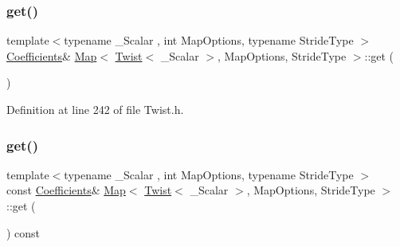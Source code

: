 \subsubsection{\texorpdfstring{get()}{get()}\hspace{0.1cm}{\footnotesize\ttfamily [1/2]}}
{\footnotesize\ttfamily template$<$typename \+\_\+\+Scalar , int Map\+Options, typename Stride\+Type $>$ \\
\hyperlink{class_map_3_01_twist_3_01___scalar_01_4_00_01_map_options_00_01_stride_type_01_4_aed5862495c86340dcb689412d79eb66a}{Coefficients}\& \hyperlink{class_map_3_01_twist_3_01___scalar_01_4_00_01_map_options_00_01_stride_type_01_4_a7bc49d9365cdda555f4d107d55a1c6b2}{Map}$<$ \hyperlink{class_twist}{Twist}$<$ \+\_\+\+Scalar $>$, Map\+Options, Stride\+Type $>$\+::get (\begin{DoxyParamCaption}{ }\end{DoxyParamCaption})\hspace{0.3cm}{\ttfamily [inline]}}



Definition at line 242 of file Twist.\+h.

\hypertarget{class_map_3_01_twist_3_01___scalar_01_4_00_01_map_options_00_01_stride_type_01_4_a6d725b7694668b1cd73c37cd6e1794ef}{}\label{class_map_3_01_twist_3_01___scalar_01_4_00_01_map_options_00_01_stride_type_01_4_a6d725b7694668b1cd73c37cd6e1794ef} 
\subsubsection{\texorpdfstring{get()}{get()}\hspace{0.1cm}{\footnotesize\ttfamily [2/2]}}
{\footnotesize\ttfamily template$<$typename \+\_\+\+Scalar , int Map\+Options, typename Stride\+Type $>$ \\
const \hyperlink{class_map_3_01_twist_3_01___scalar_01_4_00_01_map_options_00_01_stride_type_01_4_aed5862495c86340dcb689412d79eb66a}{Coefficients}\& \hyperlink{class_map_3_01_twist_3_01___scalar_01_4_00_01_map_options_00_01_stride_type_01_4_a7bc49d9365cdda555f4d107d55a1c6b2}{Map}$<$ \hyperlink{class_twist}{Twist}$<$ \+\_\+\+Scalar $>$, Map\+Options, Stride\+Type $>$\+::get (\begin{DoxyParamCaption}{ }\end{DoxyParamCaption}) const\hspace{0.3cm}{\ttfamily [inline]}}



